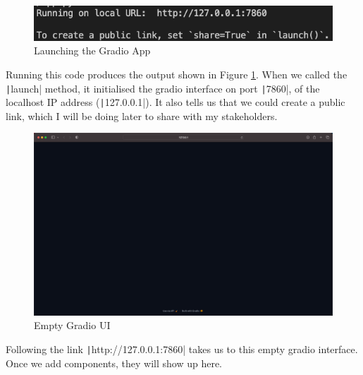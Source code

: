 \documentclass[12pt]{report}
\newcommand{\pil}[1]{\protect\texttt|#1|}
\begin{document}
\begin{figure}[H]
\centering
\includegraphics[width=14cm]{ss11.1.png}
\caption{Launching the Gradio App}\label{fig:ss11.1}
\end{figure}

Running this code produces the output shown in Figure \ref{fig:ss11.1}. When we called the \pil{launch} method, it initialised the gradio interface on port \pil{7860}, of the localhost IP address (\pil{127.0.0.1}). It also tells us that we could create a public link, which I will be doing later to share with my stakeholders.

\begin{figure}[H]
\centering
\includegraphics[width=14cm]{ss11.2.png}
\caption{Empty Gradio UI}\label{fig:ss11.2}
\end{figure}

Following the link \pil{http://127.0.0.1:7860} takes us to this empty gradio interface. Once we add components, they will show up here.

\begin{center}
\end{center}
\end{document}
